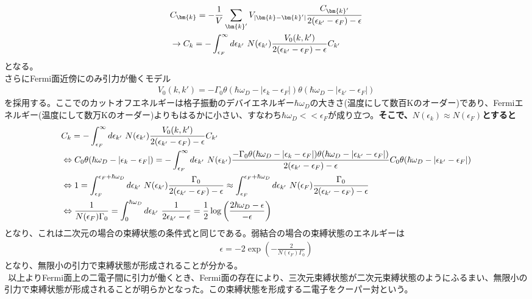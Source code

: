 \documentclass[dvipdfmx, 11pt, a4paper]{jsarticle}
\numberwithin{equation}{section}
\theoremstyle{definition}
\begin{document}
    \begin{align}
        &C_{\bm{k}} = -\frac{1}{V}\sum_{\bm{k}'}V_{|\bm{k}-\bm{k}'|}\frac{C_{\bm{k}'}}{2(\epsilon_{k'} - \epsilon_F)-\epsilon} \notag \\
        &\rightarrow C_k = -\int_{\epsilon_F}^\infty d\epsilon_{k'}\ N(\epsilon_{k'}) \frac{V_0(k,k')}{2(\epsilon_{k'} - \epsilon_F)-\epsilon} C_{k'}
    \end{align}
    となる。\\
    さらにFermi面近傍にのみ引力が働くモデル
    \begin{align}
        V_0(k,k') = -\Gamma_0\theta(\hbar \omega_D- |\epsilon_k-\epsilon_F|) \theta(\hbar \omega_D- |\epsilon_{k'}-\epsilon_F|)
    \end{align}
    を採用する。ここでのカットオフエネルギーは格子振動のデバイエネルギー$\hbar \omega_D$の大きさ(温度にして数百Kのオーダー)であり、Fermiエネルギー(温度にして数万Kのオーダー)よりもはるかに小さい、すなわち$\hbar \omega_D<<\epsilon_F$が成り立つ。\textbf{そこで、$N(\epsilon_k) \approx N(\epsilon_F)$とすると}
    \begin{align}
        &C_k = -\int_{\epsilon_F}^\infty d\epsilon_{k'}\ N(\epsilon_{k'}) \frac{V_0(k,k')}{2(\epsilon_{k'} - \epsilon_F)-\epsilon} C_{k'}\notag \\
        &\Leftrightarrow C_0 \theta(\hbar \omega_D- |\epsilon_k-\epsilon_F|)  = -\int_{\epsilon_F}^\infty d\epsilon_{k'}\ N(\epsilon_{k'}) \frac{-\Gamma_0\theta(\hbar \omega_D- |\epsilon_k-\epsilon_F|) \theta(\hbar \omega_D- |\epsilon_{k'}-\epsilon_F|)}{2(\epsilon_{k'} - \epsilon_F)-\epsilon} C_0 \theta(\hbar \omega_D- |\epsilon_{k'}-\epsilon_F|)  \notag \\
        &\Leftrightarrow  1  = \int_{\epsilon_F}^{\epsilon_F + \hbar \omega_D} d\epsilon_{k'}\ N(\epsilon_{k'}) \frac{\Gamma_0 }{2(\epsilon_{k'} - \epsilon_F)-\epsilon} \approx  \int_{\epsilon_F}^{\epsilon_F + \hbar \omega_D} d\epsilon_{k'}\ N(\epsilon_F) \frac{\Gamma_0 }{2(\epsilon_{k'} - \epsilon_F)-\epsilon}  \notag \\
        &\Leftrightarrow  \frac{1}{N(\epsilon_F) \Gamma_0 }  = \int_{0}^{ \hbar \omega_D} d\epsilon_{k'}\  \frac{1 }{2\epsilon_{k'}-\epsilon} =  \frac{1}{2} \log\left( \frac{2\hbar \omega_D-\epsilon}{-\epsilon} \right)
    \end{align}
    となり、これは二次元の場合の束縛状態の条件式と同じである。弱結合の場合の束縛状態のエネルギーは
    \begin{align}
        \epsilon = - 2\exp\left( -\frac{2}{N(\epsilon_F)\Gamma_0}\right)
    \end{align}
    となり、無限小の引力で束縛状態が形成されることが分かる。\\
    $\ \ $以上よりFermi面上の二電子間に引力が働くとき、Fermi面の存在により、三次元束縛状態が二次元束縛状態のようにふるまい、無限小の引力で束縛状態が形成されることが明らかとなった。この束縛状態を形成する二電子をクーパー対という。
\newpage
\end{document}
